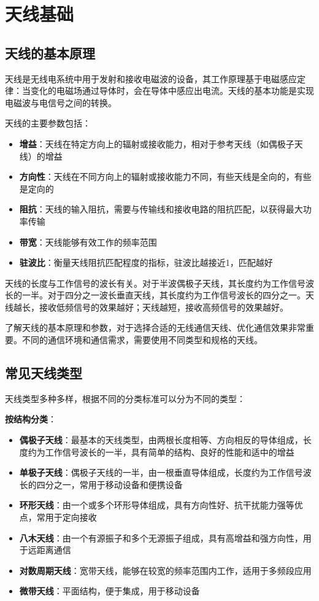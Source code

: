 \documentclass[12pt,UTF8]{ctexbook}
\begin{document}
\chapter{天线基础}

\section{天线的基本原理}

天线是无线电系统中用于发射和接收电磁波的设备，其工作原理基于电磁感应定律：当变化的电磁场通过导体时，会在导体中感应出电流。天线的基本功能是实现电磁波与电信号之间的转换。

天线的主要参数包括：

\begin{itemize}[leftmargin=3.5em]
    \item \textbf{增益}：天线在特定方向上的辐射或接收能力，相对于参考天线（如偶极子天线）的增益
    \item \textbf{方向性}：天线在不同方向上的辐射或接收能力不同，有些天线是全向的，有些是定向的
    \item \textbf{阻抗}：天线的输入阻抗，需要与传输线和接收电路的阻抗匹配，以获得最大功率传输
    \item \textbf{带宽}：天线能够有效工作的频率范围
    \item \textbf{驻波比}：衡量天线阻抗匹配程度的指标，驻波比越接近1，匹配越好
\end{itemize}

天线的长度与工作信号的波长有关。对于半波偶极子天线，其长度约为工作信号波长的一半。对于四分之一波长垂直天线，其长度约为工作信号波长的四分之一。天线越长，接收低频信号的效果越好；天线越短，接收高频信号的效果越好。

了解天线的基本原理和参数，对于选择合适的无线通信天线、优化通信效果非常重要。不同的通信环境和通信需求，需要使用不同类型和规格的天线。

\section{常见天线类型}

天线类型多种多样，根据不同的分类标准可以分为不同的类型：

\textbf{按结构分类}：
\begin{itemize}[leftmargin=3.5em]
    \item \textbf{偶极子天线}：最基本的天线类型，由两根长度相等、方向相反的导体组成，长度约为工作信号波长的一半，具有简单的结构、良好的性能和适中的增益
    \item \textbf{单极子天线}：偶极子天线的一半，由一根垂直导体组成，长度约为工作信号波长的四分之一，常用于移动设备和便携设备
    \item \textbf{环形天线}：由一个或多个环形导体组成，具有方向性好、抗干扰能力强等优点，常用于定向接收
    \item \textbf{八木天线}：由一个有源振子和多个无源振子组成，具有高增益和强方向性，用于远距离通信
    \item \textbf{对数周期天线}：宽带天线，能够在较宽的频率范围内工作，适用于多频段应用
    \item \textbf{微带天线}：平面结构，便于集成，用于移动设备
\end{itemize}
\end{document}
